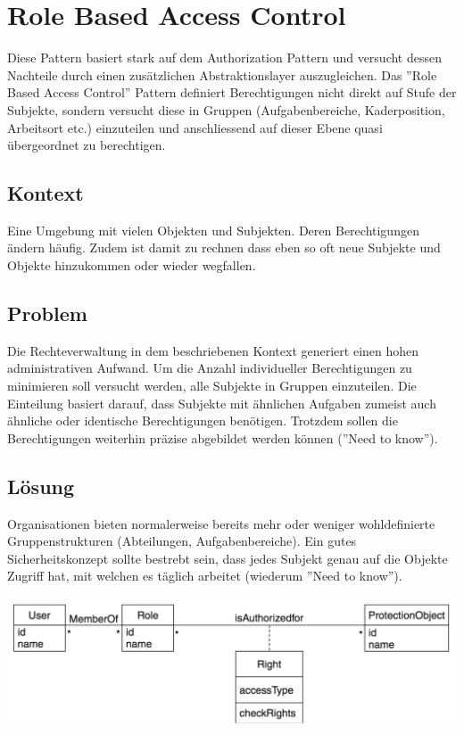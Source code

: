 \section{Role Based Access Control}

Diese Pattern basiert stark auf dem Authorization Pattern und versucht dessen Nachteile durch einen zusätzlichen Abstraktionslayer auszugleichen.
Das ''Role Based Access Control'' Pattern definiert Berechtigungen nicht direkt auf Stufe der Subjekte, sondern versucht diese in Gruppen (Aufgabenbereiche, Kaderposition, Arbeitsort etc.) einzuteilen und anschliessend auf dieser Ebene quasi übergeordnet zu berechtigen.

\subsection*{Kontext}
Eine Umgebung mit vielen Objekten und Subjekten. Deren Berechtigungen ändern häufig. Zudem ist damit zu rechnen dass eben so oft neue Subjekte und Objekte hinzukommen oder wieder wegfallen.

\subsection*{Problem}
Die Rechteverwaltung in dem beschriebenen Kontext generiert einen hohen administrativen Aufwand. Um die Anzahl individueller Berechtigungen zu minimieren soll versucht werden, alle Subjekte in Gruppen einzuteilen. Die Einteilung basiert darauf, dass Subjekte mit ähnlichen Aufgaben zumeist auch ähnliche oder identische Berechtigungen benötigen.
Trotzdem sollen die Berechtigungen weiterhin präzise abgebildet werden können (''Need to know'').

\subsection*{Lösung}
Organisationen bieten normalerweise bereits mehr oder weniger wohldefinierte Gruppenstrukturen (Abteilungen, Aufgabenbereiche).
Ein gutes Sicherheitskonzept sollte bestrebt sein, dass jedes Subjekt genau auf die Objekte Zugriff hat, mit welchen es täglich arbeitet (wiederum ''Need to know'').

\includegraphics[width=\textwidth]{chapter/01basic/rolebasedaccesscontrol.png}

